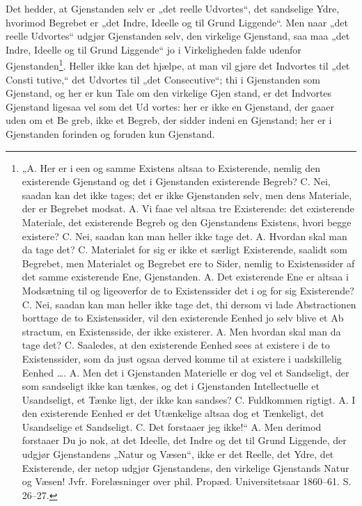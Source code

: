 \documentclass[12pt]{book}
\newcommand{\opage}[1]{\marginnote{\footnotesize\textit{[#1]}}}
\begin{document}
Det hedder, at Gjenstanden selv er „det reelle Udvortes“,
det sandselige Ydre, hvorimod Begrebet er „det Indre,
Ideelle og til Grund Liggende“. Men naar „det reelle Udvortes“
udgjør Gjenstanden selv, den virkelige Gjenstand, saa
maa „det Indre, Ideelle og til Grund Liggende“ jo i
Virkeligheden falde udenfor Gjenstanden\footnote{%
„A. Her er i een og samme Existens altsaa to Existerende, nemlig
den existerende Gjenstand og det i Gjenstanden existerende Begreb?
C. Nei, saadan kan det ikke tages; det er ikke Gjenstanden selv,
men dens Materiale, der er Begrebet modsat. A. Vi faae vel
altsaa tre Existerende: det existerende Materiale, det existerende Begreb
og den Gjenstandens Existens, hvori begge existere? C. Nei,
saadan kan man heller ikke tage det. A. Hvordan skal man da
tage det? C. Materialet for sig er ikke et særligt Existerende, saalidt
som Begrebet, men Materialet og Begrebet ere to Sider, nemlig
to Existenssider af det samme existerende Ene, Gjenstanden. A.
Det existerende Ene er altsaa i Modsætning til og ligeoverfor de
to Existenssider det i og for sig Existerende? C. Nei, saadan kan
man heller ikke tage det, thi dersom vi lade Abstractionen borttage
de to Existenssider, vil den existerende Eenhed jo selv blive et Ab%
stractum, en Existensside, der ikke existerer. A. Men hvordan skal
man da tage det? C. Saaledes, at den existerende Eenhed sees at
existere i de to Existenssider, som da just ogsaa derved komme til
at existere i uadskillelig Eenhed \dots. A. Men det i Gjenstanden
Materielle er dog vel et Sandseligt, der som sandseligt ikke kan
tænkes, og det i Gjenstanden Intellectuelle et Usandseligt, et Tænke%
ligt, der ikke kan sandses? C. Fuldkommen rigtigt. A. I den
existerende Eenhed er det Utænkelige altsaa dog et Tænkeligt, det
Usandselige et Sandseligt. C. Det forstaaer jeg ikke!“ A. Men
derimod forstaaer Du jo nok, at det Ideelle, det Indre og det
til Grund Liggende, der udgjør Gjenstandens „Natur og Væsen“,
ikke er det Reelle, det Ydre, det Existerende, der netop udgjør
Gjenstandens, den virkelige Gjenstands Natur og Væsen! Jvfr.
Forelæsninger over phil. Propæd. Universitetsaar 1860--61.
S. 26--27.}. %
Heller ikke kan
\opage{98}det hjælpe, at man vil gjøre det Indvortes til „det Consti%
tutive,“ det Udvortes til „det Consecutive“; thi i Gjenstanden
som Gjenstand, og her er kun Tale om den virkelige Gjen%
stand, er det Indvortes Gjenstand ligesaa vel som det Ud%
vortes: her er ikke en Gjenstand, der gaaer uden om et Be%
greb, ikke et Begreb, der sidder indeni en Gjenstand; her er
i Gjenstanden forinden og foruden kun Gjenstand.
\end{document}

